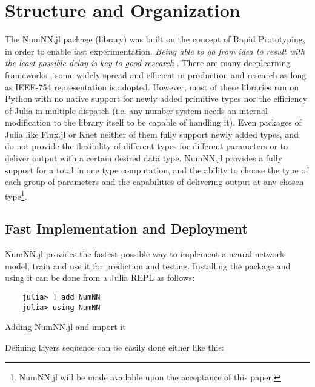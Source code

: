 \section{Structure and Organization}

The NumNN.jl  package%
 (library) was built on the concept of Rapid Prototyping, in order to enable fast experimentation. \emph{Being able to go from idea to result with the least possible delay is key to good research} \cite{Keras}. There are many deeplearning frameworks \cite{Abadi2016,Collet2015,Jia2014,Paszke2017,PyTorch2019}, some widely spread and efficient in production and research as long as IEEE-754 representation is adopted. However, most of these libraries run on Python with no native support for newly added primitive types nor the efficiency of Julia in multiple dispatch (i.e. any number system needs an internal modification to the library itself to be capable of handling it). Even packages of Julia like Flux.jl \cite{Flux.jl-2018,Innes2018} or Knet \cite{Yuret2016k} neither of them fully support newly added types, and do not provide the flexibility of different types for different parameters or to deliver output with a certain desired data type. NumNN.jl provides a fully support for a total in one type computation, and the ability to choose the type of each group of parameters and the capabilities of delivering output at any chosen type\footnote{ NumNN.jl will be made available upon the acceptance  of this paper.}.

\subsection{Fast Implementation and Deployment}

NumNN.jl provides the fastest possible way to implement a neural network model, train and use it for prediction and testing. Installing the package and using it can be done from a Julia REPL as follows:

\begin{listing}[H]
	\begin{verbatim}
	julia> ] add NumNN
	julia> using NumNN
	\end{verbatim}
	\caption{Adding NumNN.jl and import it}\label{addimport}
\end{listing}

Defining layers sequence can be easily done either like this:

